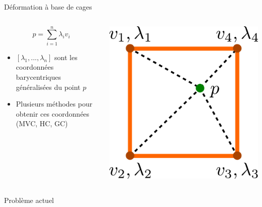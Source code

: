 \documentclass[xcolor=x11names,compress]{beamer}
\renewcommand{\(}{\begin{columns}} \renewcommand{\)}{\end{columns}}
\newcommand{\<}[1]{\begin{column}{#1}} \renewcommand{\>}{\end{column}}
\begin{document}
\begin{frame}{Déformation à base de cages}
\begin{columns}[T]
  \begin{column}{0.6\textwidth}
    \begin{displaymath}
      p = \sum_{i=1}^n \lambda_i v_i
    \end{displaymath}
    \begin{itemize}
      \item $[\lambda_1, ..., \lambda_n]$ sont les coordonnées barycentriques
      généralisées du point $p$
      \item Plusieurs méthodes pour obtenir ces coordonnées (MVC, HC, GC)
    \end{itemize}
  \end{column}
  \begin{column}{0.4\textwidth}
    \centering
    \includegraphics[scale=0.3]{Deformation-Cages}
  \end{column}
\end{columns}
\end{frame}

\begin{frame}{Problème actuel}
  \begin{columns}[t]
  \end{columns}
\end{frame}
\end{document}

